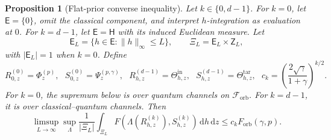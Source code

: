 \documentclass[11pt]{article}
\newtheorem{proposition}[proposition]{Proposition}
\theoremstyle{remark}
\theoremstyle{plain}
\newcommand{\cF}{\mathcal F}
\newcommand{\dd}{\mathrm d}
\newcommand{\Forb}{F_{\mathrm{orb}}}
\begin{document}
\begin{proposition}[Flat-prior converse inequality]
\label{prop:flat-prior-converse}
Let \(k\in\{0,d-1\}\).  For \(k=0\), let
\(\mathsf E=\{0\}\), omit the classical component, and interpret \(h\)-integration
as evaluation at \(0\).  For \(k=d-1\), let \(\mathsf E=\mathsf H\) with its
induced Euclidean measure.  Let
\[
  \mathsf E_L=\{h\in\mathsf E:\|h\|_\infty\le L\},
  \qquad
  \Xi_L=\mathsf E_L\times\mathsf Z_L,
\]
with \(|\mathsf E_L|=1\) when \(k=0\).  Define
\[
  R_{0,z}^{(0)}=\Phi_z^{(p)},\ \ \
   S_{0,z}^{(0)}=\Psi_z^{(p,\gamma)},\ \ \
  R_{h,z}^{(d-1)}=\Theta_{h,z}^{\mathrm{in}},\ \ \
   S_{h,z}^{(d-1)}=\Theta_{h,z}^{\mathrm{tar}},\ \ \
  c_k=\left(\frac{2\sqrt\gamma}{1+\gamma}\right)^{k/2}.
\]
For \(k=0\), the supremum below is over quantum channels on
\(\cF_{\mathrm{orb}}\). For \(k=d-1\), it is over classical--quantum
channels.  Then
\begin{equation}\label{eq:unified-flat-prior-converse}
  \limsup_{L\to\infty}\sup_\Lambda
  \frac1{|\Xi_L|}\int_{\Xi_L}
  F\!\left(\Lambda(R_{h,z}^{(k)}),S_{h,z}^{(k)}\right)
  \,\dd h\,\dd z
  \le c_k\Forb(\gamma,p).
\end{equation}
\end{proposition}
\end{document}
